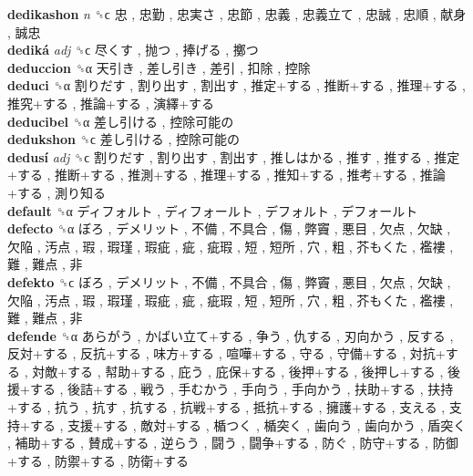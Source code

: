 \textbf{dedikashon} \emph{n}  ␝ϲ   忠 ,  忠勤 ,  忠実さ ,  忠節 ,  忠義 ,  忠義立て ,  忠誠 ,  忠順 ,  献身 ,  誠忠   \\
\textbf{dediká} \emph{adj}  ␝ϲ   尽くす ,  抛つ ,  捧げる ,  擲つ   \\
\textbf{deduccion} ␝α   天引き ,  差し引き ,  差引 ,  扣除 ,  控除   \\
\textbf{deduci} ␝α   割りだす ,  割り出す ,  割出す ,  推定+する ,  推断+する ,  推理+する ,  推究+する ,  推論+する ,  演繹+する   \\
\textbf{deducibel} ␝α   差し引ける ,  控除可能の   \\
\textbf{dedukshon} ␝ϲ   差し引ける ,  控除可能の   \\
\textbf{dedusí} \emph{adj}  ␝ϲ   割りだす ,  割り出す ,  割出す ,  推しはかる ,  推す ,  推する ,  推定+する ,  推断+する ,  推測+する ,  推理+する ,  推知+する ,  推考+する ,  推論+する ,  測り知る   \\
\textbf{default} ␝α   ディフォルト ,  ディフォールト ,  デフォルト ,  デフォールト   \\
\textbf{defecto} ␝α   ぼろ ,  デメリット ,  不備 ,  不具合 ,  傷 ,  弊竇 ,  悪目 ,  欠点 ,  欠缺 ,  欠陥 ,  汚点 ,  瑕 ,  瑕瑾 ,  瑕疵 ,  疵 ,  疵瑕 ,  短 ,  短所 ,  穴 ,  粗 ,  芥もくた ,  襤褸 ,  難 ,  難点 ,  非   \\
\textbf{defekto} ␝ϲ   ぼろ ,  デメリット ,  不備 ,  不具合 ,  傷 ,  弊竇 ,  悪目 ,  欠点 ,  欠缺 ,  欠陥 ,  汚点 ,  瑕 ,  瑕瑾 ,  瑕疵 ,  疵 ,  疵瑕 ,  短 ,  短所 ,  穴 ,  粗 ,  芥もくた ,  襤褸 ,  難 ,  難点 ,  非   \\
\textbf{defende} ␝α   あらがう ,  かばい立て+する ,  争う ,  仇する ,  刃向かう ,  反する ,  反対+する ,  反抗+する ,  味方+する ,  喧嘩+する ,  守る ,  守備+する ,  対抗+する ,  対敵+する ,  幇助+する ,  庇う ,  庇保+する ,  後押+する ,  後押し+する ,  後援+する ,  後詰+する ,  戦う ,  手むかう ,  手向う ,  手向かう ,  扶助+する ,  扶持+する ,  抗う ,  抗す ,  抗する ,  抗戦+する ,  抵抗+する ,  擁護+する ,  支える ,  支持+する ,  支援+する ,  敵対+する ,  楯つく ,  楯突く ,  歯向う ,  歯向かう ,  盾突く ,  補助+する ,  賛成+する ,  逆らう ,  闘う ,  闘争+する ,  防ぐ ,  防守+する ,  防御+する ,  防禦+する ,  防衛+する   \\
